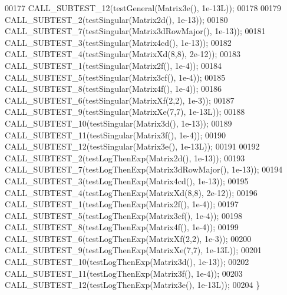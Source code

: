 \begin{DoxyCode}
00177   CALL\_SUBTEST\_12(testGeneral(Matrix3e(),        1e-13L));
00178 
00179   CALL\_SUBTEST\_2(testSingular(Matrix2d(),         1e-13));
00180   CALL\_SUBTEST\_7(testSingular(Matrix3dRowMajor(), 1e-13));
00181   CALL\_SUBTEST\_3(testSingular(Matrix4cd(),        1e-13));
00182   CALL\_SUBTEST\_4(testSingular(MatrixXd(8,8),      2e-12));
00183   CALL\_SUBTEST\_1(testSingular(Matrix2f(),         1e-4));
00184   CALL\_SUBTEST\_5(testSingular(Matrix3cf(),        1e-4));
00185   CALL\_SUBTEST\_8(testSingular(Matrix4f(),         1e-4));
00186   CALL\_SUBTEST\_6(testSingular(MatrixXf(2,2),      1e-3));
00187   CALL\_SUBTEST\_9(testSingular(MatrixXe(7,7),      1e-13L));
00188   CALL\_SUBTEST\_10(testSingular(Matrix3d(),        1e-13));
00189   CALL\_SUBTEST\_11(testSingular(Matrix3f(),        1e-4));
00190   CALL\_SUBTEST\_12(testSingular(Matrix3e(),        1e-13L));
00191 
00192   CALL\_SUBTEST\_2(testLogThenExp(Matrix2d(),         1e-13));
00193   CALL\_SUBTEST\_7(testLogThenExp(Matrix3dRowMajor(), 1e-13));
00194   CALL\_SUBTEST\_3(testLogThenExp(Matrix4cd(),        1e-13));
00195   CALL\_SUBTEST\_4(testLogThenExp(MatrixXd(8,8),      2e-12));
00196   CALL\_SUBTEST\_1(testLogThenExp(Matrix2f(),         1e-4));
00197   CALL\_SUBTEST\_5(testLogThenExp(Matrix3cf(),        1e-4));
00198   CALL\_SUBTEST\_8(testLogThenExp(Matrix4f(),         1e-4));
00199   CALL\_SUBTEST\_6(testLogThenExp(MatrixXf(2,2),      1e-3));
00200   CALL\_SUBTEST\_9(testLogThenExp(MatrixXe(7,7),      1e-13L));
00201   CALL\_SUBTEST\_10(testLogThenExp(Matrix3d(),        1e-13));
00202   CALL\_SUBTEST\_11(testLogThenExp(Matrix3f(),        1e-4));
00203   CALL\_SUBTEST\_12(testLogThenExp(Matrix3e(),        1e-13L));
00204 \}
\end{DoxyCode}
